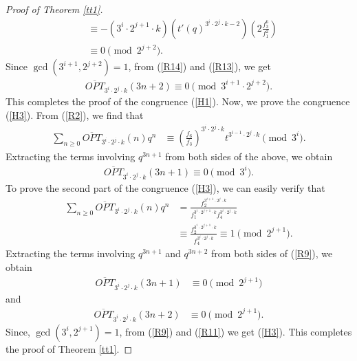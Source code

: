\documentclass[12pt,reqno,a4paper]{amsart}
\numberwithin{equation}{section}
\begin{document}
\begin{proof}[Proof of Theorem \ref{tt1}]
\begin{align}
        &\equiv -(3^{i}\cdot 2^{j+1}\cdot k)(t'(q)^{3^{i}\cdot 2^j\cdot k-2})\left(2\frac{f_3^6}{f_1^2}\right)\nonumber\\& \equiv 0\pmod{2^{j+2}}.\label{R13}
    \end{align}
    Since $\gcd(3^{i+1},2^{j+2})=1$, from (\ref{R14}) and (\ref{R13}), we get
     \begin{align*}
       \overline{OPT}_{3^i\cdot 2^j\cdot k}(3n+2)\equiv 0\pmod{3^{i+1}\cdot 2^{j+2}}.
    \end{align*}
    This completes the proof of the congruence (\ref{H1}). Now, we prove the congruence (\ref{H3}). From (\ref{R2}), we find that
    \begin{align*}
        \sum_{n\geq 0}\overline{OPT}_{3^i\cdot 2^j\cdot k}(n)q^n& \equiv \left(\frac{f_6}{f_3}\right)^{3^{i}\cdot 2^j\cdot k} t^{3^{i-1}\cdot 2^j\cdot k}\pmod{3^{i}}.
        \end{align*}
    Extracting the terms involving $q^{3n+1}$ from both sides of the above, we obtain
    \begin{align}
       \label{R10} \overline{OPT}_{3^i\cdot 2^j\cdot k}(3n+1)\equiv 0\pmod{3^{i}}.
    \end{align}
       To prove the second part of the congruence (\ref{H3}), we can easily verify that
     \begin{align}
        \sum_{n\geq 0}\overline{OPT}_{3^i\cdot 2^j\cdot k}(n)q^n&= \frac{f_2^{3^{i+1}\cdot 2^j\cdot k}}{f_1^{3^i\cdot 2^{j+1}\cdot k}f_4^{3^i\cdot 2^j\cdot k}}\nonumber\\
        & \equiv \frac{f_2^{3^i\cdot 2^{j+1}\cdot k}}{f_4^{3^i\cdot 2^j\cdot k}} \equiv 1\pmod{2^{j+1}}.\label{R9}
    \end{align}
    Extracting the terms involving $q^{3n+1}$ and $q^{3n+2}$ from both sides of (\ref{R9}), we obtain
    \begin{align}
       \label{R11} \overline{OPT}_{3^i\cdot 2^j\cdot k}(3n+1)&\equiv 0\pmod{2^{j+1}}
       \end{align}
       and
       \begin{align}
       \label{R12} \overline{OPT}_{3^i\cdot 2^j\cdot k}(3n+2)&\equiv 0\pmod{2^{j+1}}.
    \end{align}
    Since, $\gcd(3^{i},2^{j+1})=1$, from (\ref{R9}) and (\ref{R11}) we get (\ref{H3}). This completes the proof of Theorem \ref{tt1}.
 \end{proof}
\end{document}
